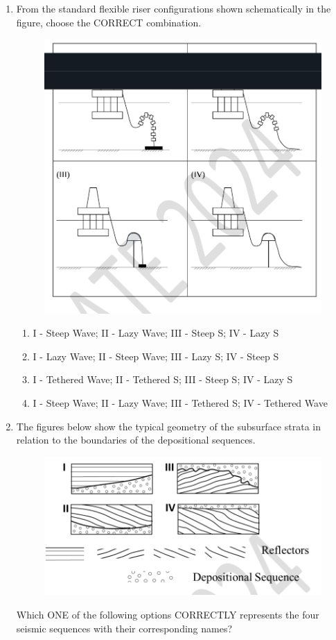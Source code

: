 \documentclass[journal,12pt,onecolumn]{IEEEtran}
\theoremstyle{remark}
\begin{document}
\begin{enumerate}
 \item From the standard flexible riser configurations shown schematically in the figure, choose the CORRECT combination.
\begin{figure}[h]
    \centering
    \includegraphics[width=0.5\columnwidth]{figs/im 9.jpeg}
    \caption{}
    \label{fig:placeholder}
\end{figure}
\begin{enumerate}
    \item I - Steep Wave; II - Lazy Wave; III - Steep S; IV - Lazy S
    \item I - Lazy Wave; II - Steep Wave; III - Lazy S; IV - Steep S
    \item I - Tethered Wave; II - Tethered S; III - Steep S; IV - Lazy S
    \item I - Steep Wave; II - Lazy Wave; III - Tethered S; IV - Tethered Wave
\end{enumerate}
\hfill{}
\item  The figures below show the typical geometry of the subsurface strata in relation to the boundaries of the depositional sequences.
\begin{figure}[h]
    \centering
    \includegraphics[width=0.5\columnwidth]{figs/im 10.jpeg}
    \caption{}
    \label{fig:placeholder}
\end{figure}
 Which ONE of the following options CORRECTLY represents the four seismic sequences with their corresponding names?


\end{enumerate}
\end{document}
